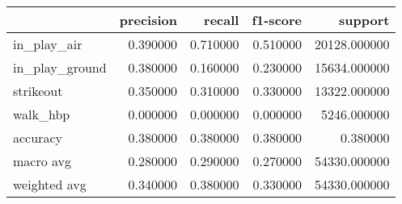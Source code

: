 \begin{tabular}{lrrrr}
\toprule
 & precision & recall & f1-score & support \\
\midrule
in_play_air & 0.390000 & 0.710000 & 0.510000 & 20128.000000 \\
in_play_ground & 0.380000 & 0.160000 & 0.230000 & 15634.000000 \\
strikeout & 0.350000 & 0.310000 & 0.330000 & 13322.000000 \\
walk_hbp & 0.000000 & 0.000000 & 0.000000 & 5246.000000 \\
accuracy & 0.380000 & 0.380000 & 0.380000 & 0.380000 \\
macro avg & 0.280000 & 0.290000 & 0.270000 & 54330.000000 \\
weighted avg & 0.340000 & 0.380000 & 0.330000 & 54330.000000 \\
\bottomrule
\end{tabular}
